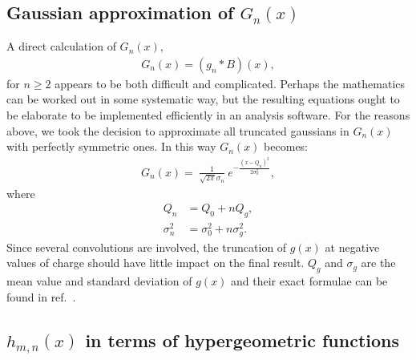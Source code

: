 \documentclass[preprint,12pt]{elsarticle}
\begin{document}
\subsection{Gaussian approximation of $G_n(x)$}
%

A direct calculation of $G_n(x)$, 
\begin{align}
G_n(x)  = (g_n*B)(x),
\end{align}   
for $n\geq 2$ appears to be both difficult and complicated. 
Perhaps the mathematics can be worked out in some systematic way, but the resulting equations ought to be elaborate to be implemented efficiently in an analysis software. 
For the reasons above, we took the decision to approximate all truncated gaussians in $G_n(x)$ with perfectly symmetric ones. 
In this way $G_n(x)$ becomes:
\begin{align}
G_n(x)  = \ \frac{1}{\sqrt{2\pi} \sigma_n } \ e^{ -\frac{ (x-Q_n)^2 }{2\sigma_n^2} },
\end{align}   
where
\begin{align}
Q_n  & = Q_0 + n Q_g, \\
\sigma_n^2 & = \sigma_0^2 + n \sigma_g^2.  
\end{align}   
Since several convolutions are involved, the truncation of $g(x)$ at negative values of charge should have little impact on the final result.  
$Q_g$ and $\sigma_g$ are the mean value and standard deviation of $g(x)$ and their exact formulae can be found in ref.~\cite{me2}.


\subsection{$h_{m,n}(x)$ in terms of hypergeometric functions}
%
\end{document}

